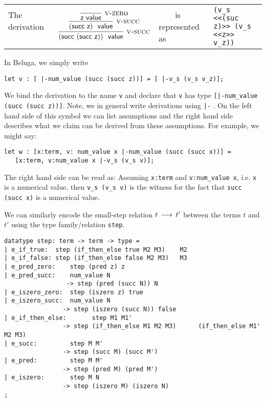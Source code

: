 \begin{tabular}{llll}
The derivation ~~~~& 
$
\infer[\Vsuc]{(\tmsucc (\tmsucc \tmzero))~\isv}
{\infer[\Vsuc]{(\tmsucc \tmzero)~\isv}{
 \infer[\Vzero]{\tmzero \isv}{}
 }
}
$
& ~~~~is represented as &  \lstinline!(v_s <<(suc z)>> (v_s <<z>> v_z))!\\[1em]
\end{tabular}

In Beluga, we simply write 

\begin{lstlisting}
let v : [ |-num_value (succ (succ z))] = [ |-v_s (v_s v_z)];
\end{lstlisting}

We bind the derivation to the name \lstinline!v! and declare that \lstinline!v!
has type \lstinline![|-num_value (succ (succ z))]!. Note, we in general write
derivations using \lstinline!|-! . On the left hand side of this symbol we can
list assumptions and the right hand side describes what we claim can be derived
from these assumptions.  For example, we might say:

\begin{lstlisting}
let w : [x:term, v: num_value x |-num_value (succ (succ x))] = 
   [x:term, v:num_value x |-v_s (v_s v)];
\end{lstlisting}

The right hand side can be read as: Assuming \lstinline!x:term! and
\lstinline!v:num_value x!, i.e. \lstinline!x! is a numerical value, then
\lstinline!v_s (v_s v)! is the witness for the fact that 
\lstinline!succ (succ x)! is a numerical value. 


We can similarly encode the small-step relation $t \mathrel{\,\longrightarrow\,} t'$ between the terms
$t$ and $t'$ using the type family/relation \lstinline!step!.

\begin{lstlisting}
datatype step: term -> term -> type = 
| e_if_true:  step (if_then_else true M2 M3)    M2
| e_if_false: step (if_then_else false M2 M3)   M3
| e_pred_zero:    step (pred z) z
| e_pred_succ:    num_value N
                 -> step (pred (succ N)) N
| e_iszero_zero:  step (iszero z) true
| e_iszero_succ:  num_value N 
                -> step (iszero (succ N)) false
| e_if_then_else:       step M1 M1'
                -> step (if_then_else M1 M2 M3)      (if_then_else M1' M2 M3)
| e_succ:         step M M'
                -> step (succ M) (succ M')
| e_pred:         step M M'
                -> step (pred M) (pred M')
| e_iszero:       step M N
                -> step (iszero M) (iszero N)
;
\end{lstlisting}


